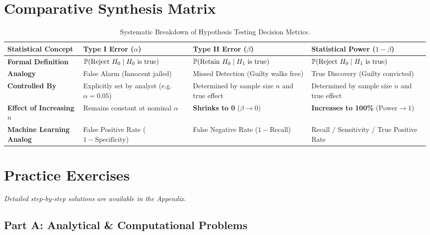 \section{Comparative Synthesis Matrix}

\begin{table}[htbp]
\centering
\small
\begin{tabular}{p{3.2cm}p{3.8cm}p{3.8cm}p{3.5cm}}
\toprule
\textbf{Statistical Concept} & \textbf{Type I Error ($\alpha$)} & \textbf{Type II Error ($\beta$)} & \textbf{Statistical Power ($1 - \beta$)} \\
\midrule
\textbf{Formal Definition} & $\P(\text{Reject } H_0 \mid H_0 \text{ is true})$ & $\P(\text{Retain } H_0 \mid H_1 \text{ is true})$ & $\P(\text{Reject } H_0 \mid H_1 \text{ is true})$ \\
\addlinespace
\textbf{Analogy} & False Alarm (Innocent jailed) & Missed Detection (Guilty walks free) & True Discovery (Guilty convicted) \\
\addlinespace
\textbf{Controlled By} & Explicitly set by analyst (e.g. $\alpha = 0.05$) & Determined by sample size $n$ and true effect & Determined by sample size $n$ and true effect \\
\addlinespace
\textbf{Effect of Increasing $n$} & Remains constant at nominal $\alpha$ & \textbf{Shrinks to 0} ($\beta \to 0$) & \textbf{Increases to 100\%} ($\text{Power} \to 1$) \\
\addlinespace
\textbf{Machine Learning Analog} & False Positive Rate ($1 - \text{Specificity}$) & False Negative Rate ($1 - \text{Recall}$) & Recall / Sensitivity / True Positive Rate \\
\bottomrule
\end{tabular}
\caption{Systematic Breakdown of Hypothesis Testing Decision Metrics.}
\end{table}

\newpage
\section{Practice Exercises}
\textit{Detailed step-by-step solutions are available in the Appendix.}

\subsection*{Part A: Analytical \& Computational Problems}

